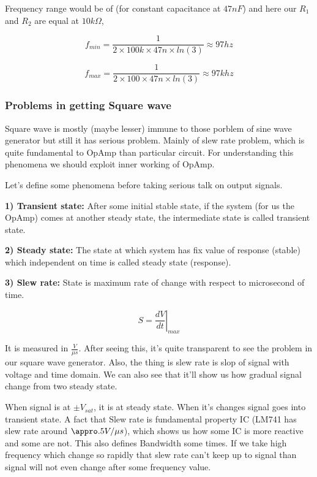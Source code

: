 \documentclass[14pt,a4paper]{extarticle}
\begin{document}
Frequency range would be of (for constant capacitance at \(47nF\)) and here our \(R_1\) and \(R_2\) are equal at \(10k\Omega\),

\begin{equation*}
\label{eq:orgb40614f}
  f_{min} =\frac{1}{2\times 100k\times 47n \times ln(3)} \approx 97 hz
\end{equation*}

\begin{equation*}
\label{eq:org6f8384a}
  f_{max} =\frac{1}{2\times 100 \times 47n \times ln(3)} \approx 97 khz
\end{equation*}


\subsubsection{Problems in getting Square wave}
\label{sec:org29f48a0}

Square wave is mostly (maybe lesser) immune to those porblem of sine wave generator but still it has serious problem. Mainly of slew rate problem, which is quite fundamental to OpAmp than particular circuit. For understanding this phenomena  we should exploit inner working of OpAmp. 

Let's define some phenomena before taking serious talk on output signals.


\textbf{\textbf{1) Transient state:}} After some initial stable state, if the system (for us the OpAmp) comes at another steady state, the intermediate state is called transient state.

\textbf{\textbf{2) Steady state:}} The state at which system has fix value of response (stable) which independent on time is called steady state (response).

\textbf{\textbf{3) Slew rate:}} State is maximum rate of change with respect to microsecond of time. 

$$ S = \left.\frac{dV}{dt}\right|_{max}$$

It is measured in \(\frac{V}{\mu s}\). After seeing this, it's quite transparent to see the problem in our square wave generator. Also, the thing is slew rate is slop of signal with voltage and time domain. We can also see that it'll show us how gradual signal change from two steady state.


When signal is at \(\pm V_{sat}\), it is at steady state. When it's changes signal goes into transient state. A fact that Slew rate is fundamental property IC (LM741 has slew rate around \(\appro .5 V/\mu s\)), which shows us how some IC is more reactive and some are not. This also defines Bandwidth some times. If we take high frequency which change so rapidly that slew rate can't keep up to signal than signal will not even change after some frequency value.
\end{document}
